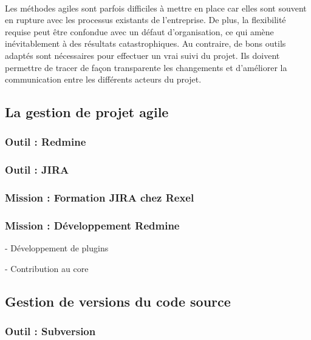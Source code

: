 \paragraph{}
Les méthodes agiles sont parfois difficiles à mettre en place car elles sont souvent en rupture avec les processus existants de l'entreprise.
De plus, la flexibilité requise peut être confondue avec un défaut d'organisation, ce qui amène inévitablement à des résultats catastrophiques.
Au contraire, de bons outils adaptés sont nécessaires pour effectuer un vrai suivi du projet.
Ils doivent permettre de tracer de façon transparente les changements et d'améliorer la communication entre les différents acteurs du projet.



\subsection{La gestion de projet agile}

\subsubsection{Outil : Redmine}

\subsubsection{Outil : JIRA}

\subsubsection{Mission : Formation JIRA chez Rexel}

\subsubsection{Mission : Développement Redmine}

- Développement de plugins

- Contribution au core



\subsection{Gestion de versions du code source}

\subsubsection{Outil : Subversion}


